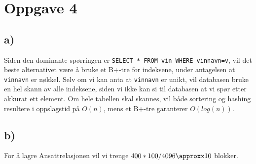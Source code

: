 \section{Oppgave 4}

\subsection{a)}

Siden den dominante spørringen er \texttt{SELECT * FROM vin WHERE vinnavn=v}, vil det beste alternativet være å bruke et B+-tre for indeksene, under antagelsen at \texttt{vinnavn} er nøkkel. Selv om vi kan anta at \texttt{vinnavn} er unikt, vil databasen bruke en hel skann av alle indeksene, siden vi ikke kan si til databasen at vi spør etter akkurat ett element. Om hele tabellen skal skannes, vil både sortering og hashing resultere i oppslagstid på $O(n)$, mens et B+-tre garanterer $O(log(n))$.

\subsection{b)}

For å lagre Ansattrelasjonen vil vi trenge $400 * 100 / 4096 \approxx 10$ blokker.
